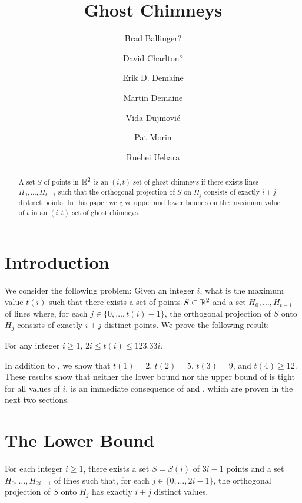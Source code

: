 \documentclass{cccg10}
\title{Ghost Chimneys}
\author{Brad Ballinger?
	\and David Charlton?
	\and Erik D. Demaine 
	\and Martin Demaine
	\and Vida Dujmovi\'c
	\and Pat Morin
	\and Ruehei Uehara}
\begin{document}
\maketitle

\begin{abstract}
A set $S$ of points in $\mathbb{R}^2$ is an $(i,t)$ set of ghost chimneys
if there exists lines $H_0,\ldots,H_{t-1}$ such that the orthogonal
projection of $S$ on $H_j$ consists of exactly $i+j$ distinct points.
In this paper we give upper and lower bounds on the maximum value of $t$
in an $(i,t)$ set of ghost chimneys.
\end{abstract}

\section{Introduction}

We consider the following problem:  Given an integer $i$, what
is the maximum value $t(i)$ such that there exists a set of points
$S\subset\mathbb{R}^2$ and a set $H_0,\ldots,H_{t-1}$ of lines where, for each
$j\in\{0,\ldots,t(i)-1\}$, the orthogonal projection of $S$ onto $H_j$
consists of exactly $i+j$ distinct points.  We prove the following result:

\begin{thm}
For any integer $i\ge 1$,  $2i \le t(i) \le 123.33i$.
\end{thm}

In addition to , we show that $t(1)=2$, $t(2)=5$, $t(3)=9$,
and $t(4)\ge 12$.  These results show that neither the lower bound
nor the upper bound of  is tight for all values of $i$.
 is an immediate consequence of  and
, which are proven in the next two sections.

\section{The Lower Bound}

\begin{lem}
For each integer $i\ge 1$, there exists a set $S=S(i)$ of $3i-1$
points and a set $H_0,\ldots,H_{2i-1}$ of lines such that, for each
$j\in\{0,\ldots,2i-1\}$, the orthogonal projection of $S$ onto $H_j$
has exactly $i+j$ distinct values.
\end{lem}
\end{document}
